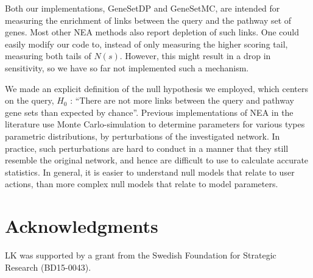 \documentclass[10pt,letterpaper]{article}
\begin{document}
Both our implementations, GeneSetDP and GeneSetMC, are intended for measuring the enrichment of links between the query and the pathway set of genes. Most other NEA methods also report depletion of such links. One could easily modify our code to, instead of only measuring the higher scoring tail, measuring both tails of $N(s)$. However, this might result in a drop in sensitivity, so we have so far not implemented such a mechanism.

We made an explicit definition of the null hypothesis we employed, which centers on the query, $H_0$ : ``There are not more links between the query and pathway gene sets than expected by chance''. Previous implementations of NEA in the literature use Monte Carlo-simulation to determine parameters for various types parametric distributions, by perturbations of the investigated network. In practice, such perturbations are hard to conduct in a manner that they still resemble the original network, and hence are difficult to use to calculate accurate statistics. In general, it is easier to understand null models that relate to user actions, than more complex null models that relate to model parameters.

\section*{Acknowledgments}

LK was supported by a grant from the Swedish Foundation for Strategic Research (BD15-0043).


\end{document}
